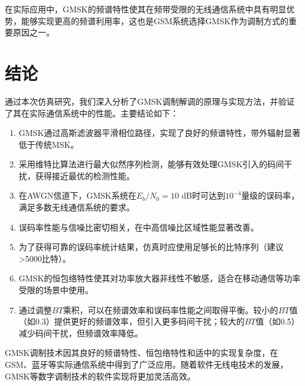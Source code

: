 \documentclass[12pt,a4paper,twoside]{article}
\numberwithin{equation}{section}
\begin{document}
在实际应用中，GMSK的频谱特性使其在频带受限的无线通信系统中具有明显优势，能够实现更高的频谱利用率，这也是GSM系统选择GMSK作为调制方式的重要原因之一。

\section{结论}

通过本次仿真研究，我们深入分析了GMSK调制解调的原理与实现方法，并验证了其在实际通信系统中的性能。主要结论如下：

\begin{enumerate}
    \item GMSK通过高斯滤波器平滑相位路径，实现了良好的频谱特性，带外辐射显著低于传统MSK。
    \item 采用维特比算法进行最大似然序列检测，能够有效处理GMSK引入的码间干扰，获得接近最优的检测性能。
    \item 在AWGN信道下，GMSK系统在$E_b/N_0 = 10$ dB时可达到$10^{-4}$量级的误码率，满足多数无线通信系统的要求。
    \item 误码率性能与信噪比密切相关，在中高信噪比区域性能显著改善。
    \item 为了获得可靠的误码率统计结果，仿真时应使用足够长的比特序列（建议>5000比特）。
    \item GMSK的恒包络特性使其对功率放大器非线性不敏感，适合在移动通信等功率受限的场景中使用。
    \item 通过调整$BT$乘积，可以在频谱效率和误码率性能之间取得平衡。较小的$BT$值（如0.3）提供更好的频谱效率，但引入更多码间干扰；较大的$BT$值（如0.5）减少码间干扰，但频谱效率降低。
\end{enumerate}

GMSK调制技术因其良好的频谱特性、恒包络特性和适中的实现复杂度，在GSM、蓝牙等实际通信系统中得到了广泛应用。随着软件无线电技术的发展，GMSK等数字调制技术的软件实现将更加灵活高效。
\end{document}
